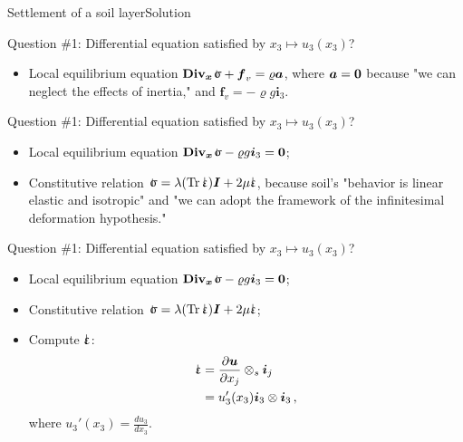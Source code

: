 \documentclass{beamer}
\newcommand{\trace}{\operatorname{Tr}}
\newcommand{\id}{d}
\newcommand{\Id}{{\boldsymbol I}}
\newcommand{\uj}{u}
\newcommand{\xj}{x}
\newcommand{\uv}{{\boldsymbol\uj}}
\newcommand{\xv}{{\boldsymbol\xj}}
\newcommand{\Div}{\mathbf{Div}}
\newcommand{\Divx}{{\Div_\xv}}
\renewcommand{\ij}{i}
\newcommand{\iv}{{\boldsymbol\ij}}
\newcommand*{\strain}{\mbox{$\hspace{0.2em}\rotatebox[x=0pt,y=0.2pt]{90}{\rule{0.02\linewidth}{0.4pt}}\hspace{-0.23em}\upvarepsilon$}}
\newcommand{\fj}{f}
\newcommand{\fv}{{\boldsymbol\fj}}
\newcommand{\roi}{\varrho}
\newcommand{\stress}{\mbox{$\hspace{0.3em}\rotatebox[x=0pt,y=0.2pt]{90}{\rule{0.017\linewidth}{0.4pt}}\hspace{-0.25em}\upsigma$}}
\newcommand{\acj}{a}
\newcommand{\acv}{{\boldsymbol\acj}}
\newcommand{\bzero}{{\bf 0}}
\begin{document}
\begin{frame}{Settlement of a soil layer}{Solution}

\begin{overprint}

\vskip-20pt
\begin{exampleblock}{Question \#1: Differential equation satisfied by $\xj_3\mapsto\uj_3(\xj_3)$?}
\begin{itemize}
\item Local equilibrium equation $\Divx\stress+\fv_v=\roi\acv$, where $\acv=\bzero$ because "we can neglect the effects of inertia," and $\fv_v=-\roi g\iv_3$.
\end{itemize}
\end{exampleblock}

\vskip-20pt
\begin{exampleblock}{Question \#1: Differential equation satisfied by $\xj_3\mapsto\uj_3(\xj_3)$?}
\begin{itemize}
\item  Local equilibrium equation $\Divx\stress-\roi g\iv_3=\bzero$;
\item Constitutive relation $\stress=\lambda(\trace\strain)\Id+2\mu\strain$, because soil's "behavior is linear elastic and isotropic" and "we can adopt the framework of the infinitesimal deformation hypothesis."
\end{itemize}
\end{exampleblock}

\vskip-20pt
\begin{exampleblock}{Question \#1: Differential equation satisfied by $\xj_3\mapsto\uj_3(\xj_3)$?}
\begin{itemize}
\item  Local equilibrium equation $\Divx\stress-\roi g\iv_3=\bzero$;
\item Constitutive relation $\stress=\lambda(\trace\strain)\Id+2\mu\strain$;
\item Compute $\strain$:
\begin{displaymath}
\begin{split}
\strain &=\frac{\partial\uv}{\partial\xj_j}\otimes_s\iv_j \\
&=\uj_3'(\xj_3)\iv_3\otimes\iv_3\,,
\end{split}
\end{displaymath}
where $\uj_3'(\xj_3)=\frac{\id\uj_3}{\id\xj_3}$.
\end{itemize}
\end{exampleblock}


\end{overprint}
\end{frame}
\end{document}
